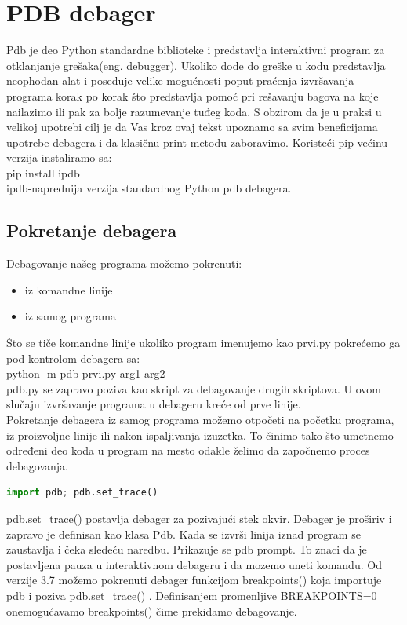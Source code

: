 \documentclass[a4paper]{article}
\begin{document}
\section{PDB debager}
Pdb je deo Python standardne biblioteke i predstavlja interaktivni program za otklanjanje grešaka(eng. debugger)\cite{pdbDocPyt}. Ukoliko dođe do greške u kodu predstavlja neophodan alat i poseduje velike mogućnosti poput praćenja izvršavanja programa korak po korak što predstavlja pomoć pri rešavanju bagova na koje nailazimo ili pak za bolje razumevanje tuđeg koda. S obzirom da je u praksi u velikoj upotrebi cilj je da Vas kroz ovaj tekst upoznamo sa svim beneficijama upotrebe debagera i da klasičnu print metodu zaboravimo. Koristeći pip većinu verzija instaliramo sa:
\\pip install ipdb
\\ipdb-naprednija verzija standardnog Python pdb debagera.
\subsection{Pokretanje debagera}
Debagovanje našeg programa možemo pokrenuti:
\begin{itemize}
\item iz komandne linije
\item iz samog programa
\end{itemize}
Što se tiče komandne linije ukoliko program imenujemo kao prvi.py pokrećemo ga pod kontrolom debagera sa:
\\python -m pdb prvi.py arg1 arg2
\\pdb.py se zapravo poziva kao skript za debagovanje drugih skriptova. U ovom slučaju izvršavanje programa u debageru kreće od prve linije.
\\Pokretanje debagera iz samog programa možemo otpočeti na početku programa, iz proizvoljne linije ili nakon ispaljivanja izuzetka. To činimo tako što umetnemo određeni deo koda u program na mesto odakle želimo da započnemo proces debagovanja.
\begin{lstlisting}[language = python, caption = {}]
import pdb; pdb.set_trace()
\end{lstlisting}
pdb.set\_trace() postavlja debager za pozivajući stek okvir. Debager je proširiv i zapravo je definisan kao klasa Pdb. Kada se izvrši linija iznad program se zaustavlja i čeka sledeću naredbu. Prikazuje se pdb prompt. To znaci da je postavljena pauza u interaktivnom debageru i da mozemo uneti komandu.
Od verzije 3.7 možemo pokrenuti debager funkcijom breakpoints() koja importuje pdb i poziva pdb.set\_trace() \cite{pdbExamples}. Definisanjem promenljive BREAKPOINTS=0 onemogućavamo breakpoints() čime prekidamo debagovanje.
\end{document}
